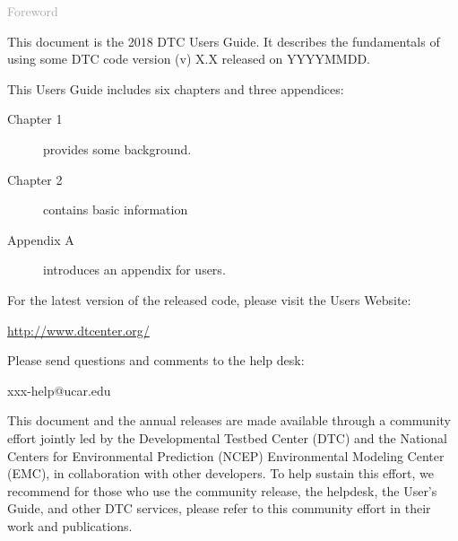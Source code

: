 \begin{titlepage}
\vspace*{0.5cm}
\noindent

\begin{flushleft}
\textcolor{darkgray}{\LARGE Foreword}
\vspace*{1cm}\par

This document is the 2018 DTC User\textquotesingle s Guide. It describes the fundamentals of using some DTC code version (v) X.X released on YYYYMMDD. 

This User\textquotesingle s Guide includes six chapters and three appendices:
\begin{description}
\item[Chapter 1] provides some background.
\item[Chapter 2] contains basic information 
\item[Appendix A] introduces an appendix for users.
\end{description}

For the latest version of the released code, please visit the User\textquotesingle s Website:
\begin{center}
\url{http://www.dtcenter.org/}
\end{center}

Please send questions and comments to the help desk:
\begin{center}
xxx-help@ucar.edu
\end{center}

This document and the annual releases are made available through a community effort jointly led by the Developmental Testbed Center (DTC) and the National Centers for Environmental Prediction (NCEP) Environmental Modeling Center (EMC), in collaboration with other developers. To help sustain this effort, we recommend for those who use the community release, the  helpdesk, the User's Guide, and other DTC services, please refer to this community effort in their work and publications. 


\end{flushleft}
\end{titlepage}
\pagebreak{}




